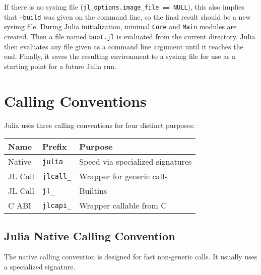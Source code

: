 If there is no sysimg file (\texttt{jl\_options.image\_file == NULL}), this also implies that \texttt{--build} was given on the command line, so the final result should be a new sysimg file. During Julia initialization, minimal \texttt{Core} and \texttt{Main} modules are created. Then a file named \texttt{boot.jl} is evaluated from the current directory. Julia then evaluates any file given as a command line argument until it reaches the end. Finally, it saves the resulting environment to a {\textquotedbl}sysimg{\textquotedbl} file for use as a starting point for a future Julia run.



\hypertarget{290466951415325789}{}


\section{Calling Conventions}



Julia uses three calling conventions for four distinct purposes:




\begin{table}[h]

\begin{tabulary}{\linewidth}{|L|L|L|}
\hline
Name & Prefix & Purpose \\
\hline
Native & \texttt{julia\_} & Speed via specialized signatures \\
\hline
JL Call & \texttt{jlcall\_} & Wrapper for generic calls \\
\hline
JL Call & \texttt{jl\_} & Builtins \\
\hline
C ABI & \texttt{jlcapi\_} & Wrapper callable from C \\
\hline
\end{tabulary}

\end{table}



\hypertarget{4788166660204734834}{}


\subsection{Julia Native Calling Convention}



The native calling convention is designed for fast non-generic calls. It usually uses a specialized signature.



